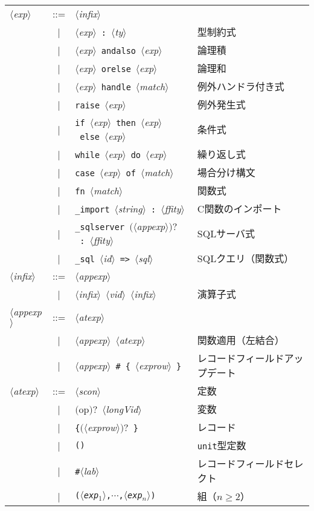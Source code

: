 \documentclass{jbook}
\newcommand{\vbar}{\mbox{\ $|$\ }}
\newcommand{\nonterm}[1]{\mbox{$\langle$}{\it #1}\mbox{$\rangle$}}
\newcommand{\term}[1]{\mbox{{\tt #1}}}
\newcommand{\optional}[1]{\mbox{$($}{\protect #1}\mbox{$)?$}}
\begin{document}
\begin{center}
\begin{tabular}{lcll}
\nonterm{exp} &::=& 
        \nonterm{infix} \\
&\vbar &\nonterm{exp}\ \term{:}\ \nonterm{ty} & 型制約式\\
&\vbar &\nonterm{exp}\ \term{andalso}\ \nonterm{exp} & 論理積\\
&\vbar &\nonterm{exp}\ \term{orelse}\ \nonterm{exp} & 論理和\\
&\vbar &\nonterm{exp}\ \term{handle}\ \nonterm{match} & 例外ハンドラ付き式\\
&\vbar &\term{raise}\ \nonterm{exp} & 例外発生式\\
&\vbar &\term{if}\ \nonterm{exp}\ \term{then}\ \nonterm{exp}\ \term{else}\ \nonterm{exp}& 条件式\\
&\vbar &\term{while}\ \nonterm{exp}\ \term{do}\ \nonterm{exp}& 繰り返し式\\
&\vbar &\term{case}\ \nonterm{exp}\ \term{of}\ \nonterm{match}& 場合分け構文\\
&\vbar &\term{fn}\ \nonterm{match}& 関数式\\
&\vbar &\term{\_import}\ \nonterm{string}\ \term{:}\ \nonterm{ffity} & C関数のインポート\\
&\vbar &\term{\_sqlserver}\ \optional{\nonterm{appexp}}\ \term{:}\ \nonterm{ffity} & SQLサーバ式\\
&\vbar &\term{\_sql}\ \nonterm{id}\ \term{=>}\ \nonterm{sql} & SQLクエリ（関数式）\\
\nonterm{infix}&::=& 
       \nonterm{appexp}& \\
&\vbar&\nonterm{infix}\ \nonterm{vid}\ \nonterm{infix} & 演算子式\\
\nonterm{appexp}&::=&
         \nonterm{atexp} \\
&\vbar& \nonterm{appexp}\ \nonterm{atexp} & 関数適用（左結合）\\
&\vbar& \nonterm{appexp}\ \term{\#}\ \term{\{}\ \nonterm{exprow}\ \term{\}} 
           & レコードフィールドアップデート\\
\nonterm{atexp}&::=&
       \nonterm{scon} & 定数 \\
&\vbar&\optional{op}\ \nonterm{longVid} & 変数\\
&\vbar&\term{\{}\optional{\nonterm{exprow}}\ \term{\}}& レコード\\
&\vbar&\term{()}& \term{unit}型定数\\
&\vbar&\term{\#}\nonterm{lab}& レコードフィールドセレクト\\
&\vbar&\term{(\nonterm{exp$_1$},$\cdots$,\nonterm{exp$_n$})}& 組（$n\ge 2$）\\

\end{tabular}
\end{center}
\end{document}

